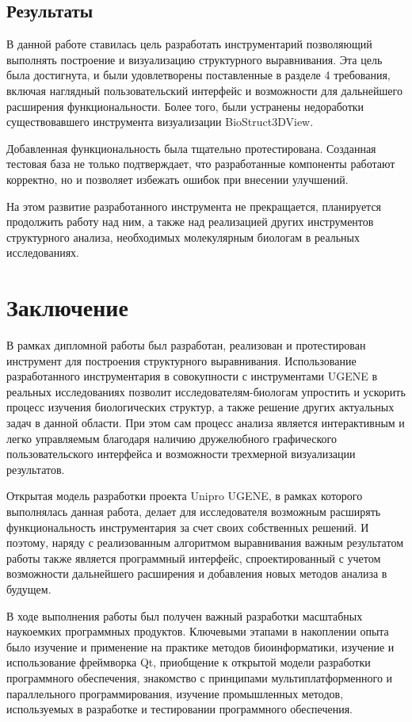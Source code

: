 \documentclass[a4paper, 12pt, titlepage, utf8]{extarticle}
\let\oldsection\section         %
\renewcommand{\section}{\newpage\oldsection}
\begin{document}
\subsection{Результаты}
В данной работе ставилась цель разработать инструментарий позволяющий выполнять построение и визуализацию структурного выравнивания. Эта цель была достигнута, и были удовлетворены поставленные в разделе 4 требования, включая наглядный пользовательский интерфейс и возможности для дальнейшего расширения функциональности. Более того, были устранены недоработки существовавшего инструмента визуализации BioStruct3DView.

Добавленная функциональность была тщательно протестирована. Созданная тестовая база не только подтверждает, что разработанные компоненты работают корректно, но и позволяет избежать ошибок при внесении улучшений.

На этом развитие разработанного инструмента не прекращается, планируется продолжить работу над ним, а также над реализацией других инструментов структурного анализа, необходимых молекулярным биологам в реальных исследованиях.


\section{Заключение}
В рамках дипломной работы был разработан, реализован и протестирован инструмент для построения структурного выравнивания. Использование разработанного инструментария в совокупности с инструментами UGENE в реальных исследованиях позволит исследователям-биологам упростить и ускорить процесс изучения биологических структур, а также решение других актуальных задач в данной области. При этом сам процесс анализа является интерактивным и легко управляемым благодаря наличию дружелюбного графического пользовательского интерфейса и возможности трехмерной визуализации результатов.

Открытая модель разработки проекта Unipro UGENE, в рамках которого выполнялась данная работа, делает для исследователя возможным расширять функциональность инструментария за счет своих собственных решений. И поэтому, наряду с реализованным алгоритмом выравнивания важным результатом работы также является программный интерфейс, спроектированный с учетом возможности дальнейшего расширения и добавления новых методов анализа в будущем.

В ходе выполнения работы был получен важный разработки масштабных наукоемких программных продуктов. Ключевыми этапами в накоплении опыта было изучение и применение на практике методов биоинформатики, изучение и использование фреймворка Qt, приобщение к открытой модели разработки программного обеспечения, знакомство с принципами мультиплатформенного и параллельного программирования, изучение промышленных методов, используемых в разработке и тестировании программного обеспечения.
\end{document}
